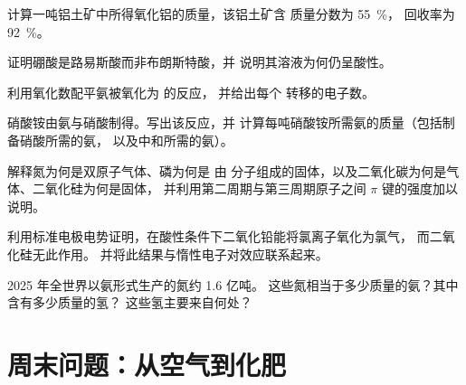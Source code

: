 \begin{exercise}[$\star\star$]\label{exo:b1:p-block-13-15:6}
计算一吨铝土矿中所得氧化铝的质量，该铝土矿含
 质量分数为 \qty{55}{\percent}，
回收率为 \qty{92}{\percent}。
\end{exercise}

\begin{exercise}[$\star\star$]\label{exo:b1:p-block-13-15:7}
证明硼酸是路易斯酸而非布朗斯特酸，并
说明其溶液为何仍呈酸性。
\end{exercise}

\begin{exercise}[$\star\star$]\label{exo:b1:p-block-13-15:8}
利用氧化数配平氨被氧化为  的反应，
并给出每个  转移的电子数。
\end{exercise}

\begin{exercise}[$\star\star$]\label{exo:b1:p-block-13-15:9}
硝酸铵由氨与硝酸制得。写出该反应，并
计算每吨硝酸铵所需氨的质量（包括制备硝酸所需的氨，
以及中和所需的氨）。
\end{exercise}

\begin{exercise}[$\star\star\star$]\label{exo:b1:p-block-13-15:10}
解释氮为何是双原子气体、磷为何是
由  分子组成的固体，以及二氧化碳为何是气体、二氧化硅为何是固体，
并利用第二周期与第三周期原子之间 $\pi$ 键的强度加以说明。
\end{exercise}

\begin{exercise}[$\star\star\star$]\label{exo:b1:p-block-13-15:11}
利用标准电极电势证明，在酸性条件下二氧化铅能将氯离子氧化为氯气，
而二氧化硅无此作用。
并将此结果与惰性电子对效应联系起来。
\end{exercise}

\begin{exercise}[$\star\star\star$]\label{exo:b1:p-block-13-15:12}
2025 年全世界以氨形式生产的氮约 1.6 亿吨。
这些氮相当于多少质量的氨？其中含有多少质量的氢？
这些氢主要来自何处？
\end{exercise}

\section{周末问题：从空气到化肥}


